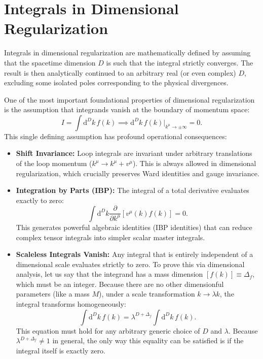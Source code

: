 \section{Integrals in Dimensional Regularization}

Integrals in dimensional regularization are mathematically defined by assuming that the spacetime dimension $D$ is such that the integral strictly converges. The result is then analytically continued to an arbitrary real (or even complex) $D$, excluding some isolated poles corresponding to the physical divergences.

One of the most important foundational properties of dimensional regularization is the assumption that integrands vanish at the boundary of momentum space:
\[
    I = \int \mathrm{d}^D k \, f(k) \implies \mathrm{d}^D k \, f(k) \Big|_{k^{\mu} \to \pm \infty} = 0.
\]
This single defining assumption has profound operational consequences:
\begin{itemize}
    \item \textbf{Shift Invariance:} Loop integrals are invariant under arbitrary translations of the loop momentum ($k^\mu \to k^\mu + v^\mu$). This is always allowed in dimensional regularization, which crucially preserves Ward identities and gauge invariance.
    \item \textbf{Integration by Parts (IBP):} The integral of a total derivative evaluates exactly to zero:
          \[
              \int \mathrm{d}^D k \frac{\partial}{\partial k^\mu} \left[ v^\mu(k) f(k) \right] = 0.
          \]
          This generates powerful algebraic identities (IBP identities) that can reduce complex tensor integrals into simpler scalar master integrals.
    \item \textbf{Scaleless Integrals Vanish:} Any integral that is entirely independent of a dimensional scale evaluates strictly to zero.
          To prove this via dimensional analysis, let us say that the integrand has a mass dimension $[f(k)] \equiv \Delta_f$, which must be an integer. Because there are no other dimensionful parameters (like a mass $M$), under a scale transformation $k \to \lambda k$, the integral transforms homogeneously:
          \[
              \int \mathrm{d}^D k \, f(k) = \lambda^{D + \Delta_f} \int \mathrm{d}^D k \, f(k).
          \]
          This equation must hold for any arbitrary generic choice of $D$ and $\lambda$. Because $\lambda^{D + \Delta_f} \neq 1$ in general, the only way this equality can be satisfied is if the integral itself is exactly zero.
\end{itemize}

